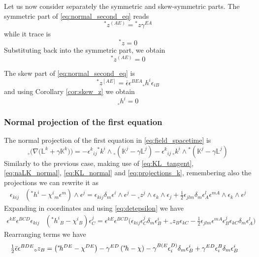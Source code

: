 \documentclass[a4paper, 11pt]{article}
\def\L{\mathbb{L}}
\def\K{\mathbb{K}}
\def\ga{\gamma}
\def\de{\delta}
\def\ep{\epsilon}
\def\na{\nabla}
\def\we{\wedge}
\def\tp#1{{}^\ast\!#1}
\def\np#1{{}_\circ#1}
\numberwithin{equation}{section}
\begin{document}
Let us now consider separately the symmetric and skew-symmetric parts. The symmetric part of \eqref{eq:normal_second_eq} reads
\[
    \tp z^{(AE)} = \tp z \ga^{EA}
\]
while it trace is 
\[\tp z = 0\]
Substituting back into the symmetric part, we obtain
\begin{equation}
   \boxed{ \tp z^{(AE)} = 0 }
    \label{eq:symm_z}
\end{equation}

The skew part of \eqref{eq:normal_second_eq} is
\[
{\tp z^{[AE]}  =  \bar \ep\ep^{BEA} \np h^i \ep_{iB}}
\]
and using Corollary \ref{cor:skew_z} we  obtain 
\begin{equation}
    \boxed{\np h^i = 0}
    \label{eq:np_h}
\end{equation}





\subsubsection{Normal projection of the first equation}
The normal projection of the first equation in \eqref{eq:field_spacetime} is
\begin{equation*}
    \np\Big(\na\big(\L^k + \ga \K^k\big)\Big)= -\ep^k{}_{ij} \tp k^i \we \np\left(\K^j - \ga \L^j\right) - \ep^k{}_{ij} \, \np k^i \we \tp\left(\K^j - \ga \L^j\right)
\end{equation*}
Similarly to the previous case, making use of \eqref{eq:KL_tangent}, \eqref{eq:naLK_normal}, \eqref{eq:KL_normal} and \eqref{eq:projections_k}, remembering also the projections we can rewrite it as
\begin{align*}
  \ep_{kij} &\left(\tp h^i - \chi^i{}_m \ep^m \right)\we \ep^j =  \ep_{kij} \de_m \ep^i \we \ep^j - \np z^j \we \ep_k \we \ep_j + \tfrac 1 2 \ep_{jlm}\de_m \ep^l_A \ep^{mA} \we \ep_k \we \ep^j  
\end{align*}
Expanding in coordinates and using \eqref{eq:detepsilon} we have
\begin{align*}
    \ep^{kE}\ep^{BCD} \ep_{kij} &\left(\tp h^i{}_B - \chi^i{}_B \right) \ep^j_C  = \ep^{kE}\ep^{BCD}\Big( \ep_{kij}  \ep^j_C \de_m \ep^i_B + \np z_B\ep_{kC} - \tfrac 1 2 \ep_{jlm} \ep^{mA}  \ep^j_B\ep_{kC} \de_m \ep^l_A\Big)
\end{align*}
Rearranging terms we have
\begin{equation}
    \begin{aligned}
    \tfrac 1 2 \bar \ep \ep^{BDE}&\np z_B = \left(\tp h^{DE} - \chi^{DE} \right) - \ga^{ED}\left(\tp h - \chi \right)  -  \ga^{B(E}_{\vphantom{-1} }\ep^{D)}_i \de_m \ep^i_B + \ga^{ED}_{\vphantom{-1} }\ep^{B}_i \de_m \ep^i_B 
    \end{aligned}
    \label{eq:normal_first_eq}
\end{equation}
    
\end{document}
